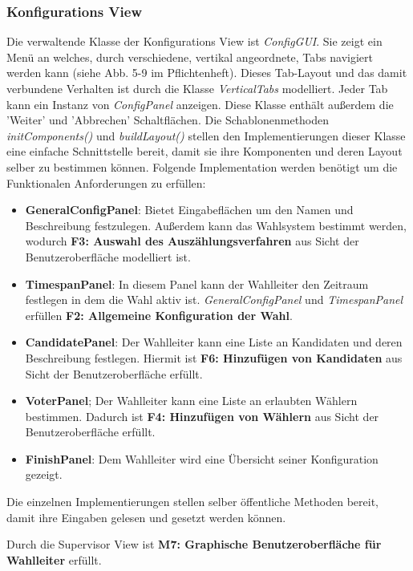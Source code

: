 \documentclass[parskip=full]{scrartcl}
\newcommand{\textitx}[1]{\mbox{\textit{#1}}}
\newcommand{\fakeparagraph}[1]{\textbf{#1}}
\begin{document}
		\subsubsection{Konfigurations View}
		Die verwaltende Klasse der Konfigurations View ist \textitx{ConfigGUI}. Sie zeigt ein Menü an welches, durch verschiedene, vertikal angeordnete, Tabs navigiert werden kann (siehe Abb. 5-9 im Pflichtenheft). Dieses Tab-Layout und das damit verbundene Verhalten ist durch die Klasse \textitx{VerticalTabs} modelliert. Jeder Tab kann ein Instanz von \textitx{ConfigPanel} anzeigen. Diese Klasse enthält außerdem die 'Weiter' und 'Abbrechen' Schaltflächen. Die Schablonenmethoden \textitx{initComponents()} und \textitx{buildLayout()} stellen den Implementierungen dieser Klasse eine einfache Schnittstelle bereit, damit sie ihre Komponenten und deren Layout selber zu bestimmen können. 
		Folgende Implementation werden benötigt um die Funktionalen Anforderungen zu erfüllen:
		\begin{itemize}
			\item\fakeparagraph{GeneralConfigPanel}: Bietet Eingabeflächen um den Namen und Beschreibung festzulegen. Außerdem kann das Wahlsystem bestimmt werden, wodurch \textbf{F3: Auswahl des Auszählungsverfahren} aus Sicht der Benutzeroberfläche modelliert ist.
			\item\fakeparagraph{TimespanPanel}: In diesem Panel kann der Wahlleiter den Zeitraum festlegen in dem die Wahl aktiv ist. \textitx{GeneralConfigPanel} und \textitx{TimespanPanel} erfüllen \textbf{F2: Allgemeine Konfiguration der Wahl}.
			\item\fakeparagraph{CandidatePanel}: Der Wahlleiter kann eine Liste an Kandidaten und deren Beschreibung festlegen. Hiermit ist \textbf{F6: Hinzufügen von Kandidaten} aus Sicht der Benutzeroberfläche erfüllt.
			\item\fakeparagraph{VoterPanel}; Der Wahlleiter kann eine Liste an erlaubten Wählern bestimmen. Dadurch ist \textbf{F4: Hinzufügen von Wählern} aus Sicht der Benutzeroberfläche erfüllt.
			\item\fakeparagraph{FinishPanel}: Dem Wahlleiter wird eine Übersicht seiner Konfiguration gezeigt. 
		\end{itemize}
		Die einzelnen Implementierungen stellen selber öffentliche Methoden bereit, damit ihre Eingaben gelesen und gesetzt werden können.
		
		Durch die Supervisor View ist \textbf{M7: Graphische Benutzeroberfläche für Wahlleiter} erfüllt.
		
\end{document}
